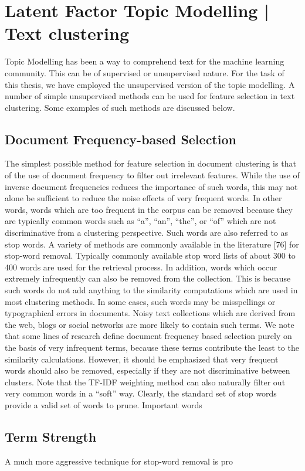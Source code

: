 \chapter{Latent Factor Topic Modelling | Text clustering}

Topic Modelling has been a way to comprehend text for the machine learning community. This can be of supervised or unsupervised nature. For the task of this thesis, we have employed the unsupervised version of the topic modelling. A number of simple unsupervised methods can be used for feature selection in text clustering. Some examples of such methods are discussed below.

\section{Document Frequency-based Selection}
The simplest possible method for feature selection in document clustering is that of the use of document frequency to filter out irrelevant features. While the use of inverse document frequencies reduces the importance of such words, this may not alone be sufficient to reduce the noise effects of very frequent words. In other words, words which are too frequent in the corpus can be removed because they are typically common words such as “a”, “an”, “the”, or “of” which are not discriminative from a clustering perspective. Such words are also referred to as stop words.
A variety of methods are commonly available in the literature [76] for stop-word removal.  Typically commonly available stop word lists of
about 300 to 400 words are used for the retrieval process. In addition,
words which occur extremely infrequently can also be removed from
the collection. This is because such words do not add anything to the
similarity computations which are used in most clustering methods. In some cases, such words may be misspellings or typographical errors in
documents. Noisy text collections which are derived from the web, blogs
or social networks are more likely to contain such terms. We note that
some lines of research define document frequency based selection purely
on the basis of very infrequent terms, because these terms contribute the
least to the similarity calculations. However, it should be emphasized
that very frequent words should also be removed, especially if they are
not discriminative between clusters. Note that the TF-IDF weighting
method can also naturally filter out very common words in a “soft” way.
Clearly, the standard set of stop words provide a valid set of words to
prune. Important words 

\section{Term Strength}
A much more aggressive technique for stop-word removal is pro





